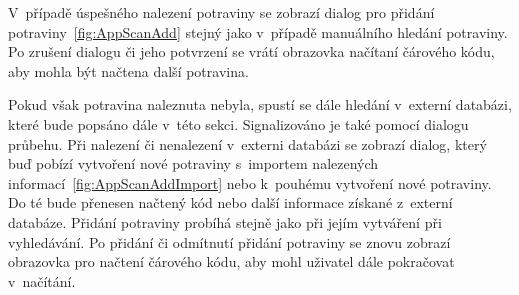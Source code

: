 \documentclass[thesis=B,czech]{FITthesis}[2013/10/20]
\begin{document}
V~případě úspešného nalezení potraviny se zobrazí dialog pro přidání potraviny~\ref{fig:AppScanAdd} stejný jako v~případě manuálního hledání potraviny. Po zrušení dialogu či jeho potvrzení se vrátí obrazovka načítaní čárového kódu, aby mohla být načtena další potravina.

Pokud však potravina naleznuta nebyla, spustí se dále hledání v~externí databázi, které bude popsáno dále v~této sekci. Signalizováno je také pomocí dialogu průbehu. Při nalezení či nenalezení v~externi databázi se zobrazí dialog, který buď pobízí vytvoření nové potraviny s~importem nalezených informací~\ref{fig:AppScanAddImport} nebo k~pouhému vytvoření nové potraviny. Do té bude přenesen načtený kód nebo další informace získané z~externí databáze. Přidání potraviny probíhá stejně jako při jejím vytváření při vyhledávání. Po přidání či odmítnutí přidání potraviny se znovu zobrazí obrazovka pro načtení čárového kódu, aby mohl uživatel dále pokračovat v~načítání.
\end{document}
